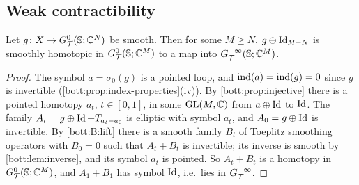 \subsection{Weak contractibility}

\begin{proposition}\label{bott:prop:deform-smoothing}
  Let $g\colon X\to G^{0}_{\mathcal{T}}(\mathbb{S};\mathbb{C}^N)$ be smooth. Then for some $M\ge N$, $g\oplus\operatorname{Id}_{M-N}$ is
  smoothly homotopic in $G^{0}_{\mathcal{T}}(\mathbb{S};\mathbb{C}^M)$ to a map into $G^{-\infty}_{\mathcal{T}}(\mathbb{S};\mathbb{C}^M)$.
\end{proposition}
\begin{proof}
  The symbol $a=\sigma_0(g)$ is a pointed loop, and $\operatorname{ind}(a)=\operatorname{ind}(g)=0$ since $g$ is
  invertible (\cref{bott:prop:index-properties}(iv)). By \cref{bott:prop:injective} there is a
  pointed homotopy $a_t$, $t\in[0,1]$, in some $\operatorname{GL}(M,\mathbb{C})$ from $a\oplus\operatorname{Id}$ to $\operatorname{Id}$. The
  family $A_t=g\oplus\operatorname{Id}+T_{a_t-a_0}$ is elliptic with symbol $a_t$, and $A_0=g\oplus\operatorname{Id}$
  is invertible. By \ref{bott:B:lift} there is a smooth family $B_t$ of Toeplitz smoothing
  operators with $B_0=0$ such that $A_t+B_t$ is invertible; its inverse is smooth by
  \cref{bott:lem:inverse}, and its symbol $a_t$ is pointed. So $A_t+B_t$ is a homotopy
  in $G^{0}_{\mathcal{T}}(\mathbb{S};\mathbb{C}^M)$, and $A_1+B_1$ has symbol $\operatorname{Id}$, i.e.\ lies in $G^{-\infty}_{\mathcal{T}}$.
\end{proof}

